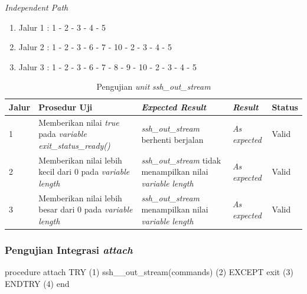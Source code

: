 \noindent
\emph{Independent Path}

\begin{enumerate}
\item Jalur 1 : 1 - 2 - 3 - 4 - 5
\item Jalur 2 : 1 - 2 - 3 - 6 - 7 - 10 - 2 - 3 - 4 - 5
\item Jalur 3 : 1 - 2 - 3 - 6 - 7 - 8 - 9 - 10 - 2 - 3 - 4 - 5
\end{enumerate}

\begin{longtable}{|P{.06\textwidth}|P{.30\textwidth}|P{.30\textwidth}|P{.10\textwidth}|P{.08\textwidth}|}
  \caption{Pengujian \emph{unit} \emph{ssh\_out\_stream}} \label{jalur:ssh_out_stream}\\
  \hline
  \textbf{Jalur} & \textbf{Prosedur Uji} &
                                                        \textbf{\emph{Expected Result}}
  & \textbf{\emph{Result}} & \textbf{Status} \\\hline
  1 & Memberikan nilai \emph{true} pada \emph{variable}
      \emph{exit\_status\_ready()} & \emph{ssh\_out\_stream} berhenti berjalan & \emph{As expected} & Valid \\\hline
  2 & Memberikan nilai lebih kecil dari 0 pada
      \emph{variable length} & \emph{ssh\_out\_stream} tidak menampilkan nilai \emph{variable} \emph{length}
  & \emph{As expected} & Valid \\\hline
  3 & Memberikan nilai lebih besar dari 0 pada
      \emph{variable length} & \emph{ssh\_out\_stream} menampilkan nilai
                               \emph{variable} \emph{length} & \emph{As expected} & Valid \\\hline
\end{longtable}

\subsubsection{Pengujian Integrasi \emph{attach}}

\begin{code}
\begin{ignasicblock}[title=attach,minted language=text]
procedure attach
TRY                                         (1)
    ssh__out_stream(commands)               (2)
EXCEPT
    exit                                    (3)
ENDTRY                                      (4)
end
\end{ignasicblock}
\label{pc:attach-c}
\end{code}


